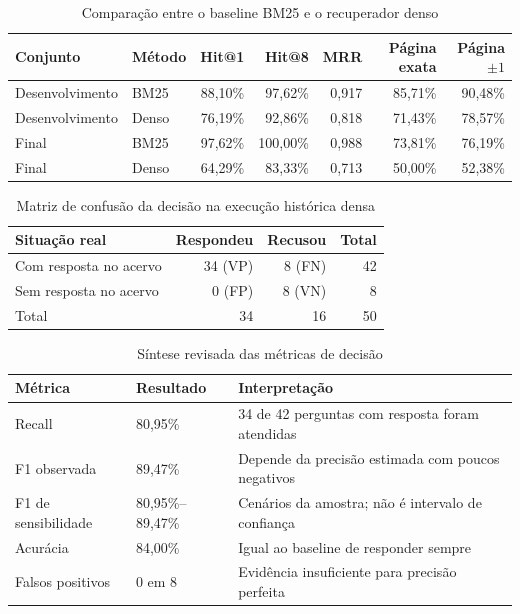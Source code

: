 
\begin{table}[htbp]
\centering
\caption{Comparação entre o baseline BM25 e o recuperador denso}
\label{tab:comparacao-recuperadores}
\begin{tabular}{llrrrrr}
\hline
Conjunto & Método & Hit@1 & Hit@8 & MRR & Página exata & Página $\pm 1$ \\
\hline
Desenvolvimento & BM25 & 88,10\% & 97,62\% & 0,917 & 85,71\% & 90,48\% \\
Desenvolvimento & Denso & 76,19\% & 92,86\% & 0,818 & 71,43\% & 78,57\% \\
Final & BM25 & 97,62\% & 100,00\% & 0,988 & 73,81\% & 76,19\% \\
Final & Denso & 64,29\% & 83,33\% & 0,713 & 50,00\% & 52,38\% \\
\hline
\end{tabular}
\end{table}

\begin{table}[htbp]
\centering
\caption{Matriz de confusão da decisão na execução histórica densa}
\label{tab:matriz-confusao-decisao}
\begin{tabular}{lrrr}
\hline
Situação real & Respondeu & Recusou & Total \\
\hline
Com resposta no acervo & 34 (VP) & 8 (FN) & 42 \\
Sem resposta no acervo & 0 (FP) & 8 (VN) & 8 \\
\hline
Total & 34 & 16 & 50 \\
\hline
\end{tabular}
\end{table}

\begin{table}[htbp]
\centering
\caption{Síntese revisada das métricas de decisão}
\label{tab:metricas-decisao-revisadas}
\begin{tabular}{lll}
\hline
Métrica & Resultado & Interpretação \\
\hline
Recall & 80,95\% & 34 de 42 perguntas com resposta foram atendidas \\
F1 observada & 89,47\% & Depende da precisão estimada com poucos negativos \\
F1 de sensibilidade & 80,95\%--89,47\% & Cenários da amostra; não é intervalo de confiança \\
Acurácia & 84,00\% & Igual ao baseline de responder sempre \\
Falsos positivos & 0 em 8 & Evidência insuficiente para precisão perfeita \\
\hline
\end{tabular}
\end{table}
